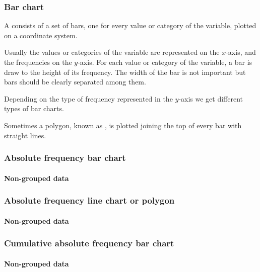 \begin{frame}
\frametitle{Bar chart}
A  consists of a set of bars, one for every value or category of the variable, plotted on a
coordinate system.

Usually the values or categories of the variable are represented on the $x$-axis, and the frequencies on the $y$-axis. 
For each value or category of the variable, a bar is draw to the height of its frequency.
The width of the bar is not important but bars should be clearly separated among them. 

Depending on the type of frequency represented in the $y$-axis we get different types of bar charts.
 
Sometimes a polygon, known as , is plotted joining the top of every bar with
straight lines.
\end{frame}



\begin{frame}
\frametitle{Absolute frequency bar chart}
\framesubtitle{Non-grouped data}
\begin{center}
\scalebox{0.6}{} 
\end{center}
\end{frame}


\begin{frame}
\frametitle{Absolute frequency line chart or polygon}
\framesubtitle{Non-grouped data}
\begin{center}
\scalebox{0.6}{} 
\end{center}
\end{frame}


\begin{frame}
\frametitle{Cumulative absolute frequency bar chart}
\framesubtitle{Non-grouped data}
\begin{center}
\scalebox{0.6}{} 
\end{center}
\end{frame}


